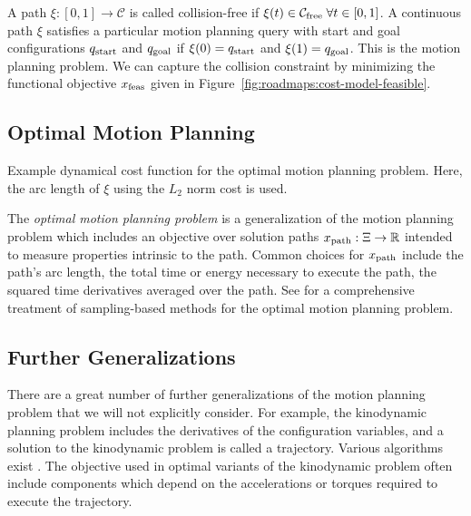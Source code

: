 A path $\xi : [0,1] \rightarrow \mathcal{C}$
is called collision-free if
$\xi(t) \in \mathcal{C}_{\mbox{\scriptsize free}} \;\forall t \in [0,1]$.
A continuous path $\xi$ satisfies a particular motion planning query
with start and goal configurations $q_{\mbox{\scriptsize start}}$ and $q_{\mbox{\scriptsize goal}}$
if $\xi(0) = q_{\mbox{\scriptsize start}}$ and $\xi(1) = q_{\mbox{\scriptsize goal}}$.
This is the motion planning problem.
We can capture the collision constraint by minimizing
the functional objective $x_{\mbox{\scriptsize feas}}$
given in Figure~\ref{fig:roadmaps:cost-model-feasible}.

\subsection{Optimal Motion Planning}

\begin{marginfigure}
   \centering
   \caption{Example dynamical cost function for the optimal
      motion planning problem.
      Here, the arc length of $\xi$ using the $L_2$ norm cost is used.}
   \label{fig:roadmaps:cost-model-path}
\end{marginfigure}

The \emph{optimal motion planning problem}
is a generalization of the motion planning problem which
includes an objective over solution paths
$x_{\mbox{\scriptsize path}} : \Xi \rightarrow \mathbb{R}$
intended to measure properties intrinsic to the path.
Common choices for $x_{\mbox{\scriptsize path}}$ include
the path's arc length,
the total time or energy necessary to execute the path,
the squared time derivatives averaged over the path.
See \citep{karaman2011samplingoptimal} for a comprehensive treatment
of sampling-based methods for the optimal motion planning problem.


\subsection{Further Generalizations}

There are a great number of further generalizations of the
motion planning problem that we will not explicitly consider.
For example,
the kinodynamic planning problem includes the derivatives of the
configuration variables,
and a solution to the kinodynamic problem is called a trajectory.
Various algorithms exist \citep{lavallekuffner1999rrt}.
The objective used in optimal variants of the kinodynamic problem
often include components which depend on the accelerations or torques
required to execute the trajectory.

